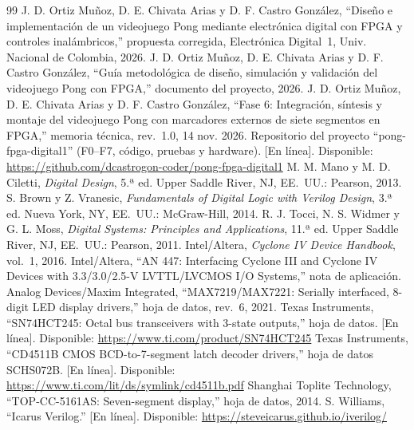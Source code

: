 \documentclass[conference,a4paper]{IEEEtran}
\begin{document}
\begin{thebibliography}{99}
 J. D. Ortiz Muñoz, D. E. Chivata Arias y D. F. Castro González, ``Diseño e implementación de un videojuego Pong mediante electrónica digital con FPGA y controles inalámbricos,'' propuesta corregida, Electrónica Digital~1, Univ. Nacional de Colombia, 2026.
 J. D. Ortiz Muñoz, D. E. Chivata Arias y D. F. Castro González, ``Guía metodológica de diseño, simulación y validación del videojuego Pong con FPGA,'' documento del proyecto, 2026.
 J. D. Ortiz Muñoz, D. E. Chivata Arias y D. F. Castro González, ``Fase 6: Integración, síntesis y montaje del videojuego Pong con marcadores externos de siete segmentos en FPGA,'' memoria técnica, rev.~1.0, 14 nov. 2026.
 Repositorio del proyecto ``pong-fpga-digital1'' (F0--F7, código, pruebas y hardware). [En línea]. Disponible: \url{https://github.com/dcastrogon-coder/pong-fpga-digital1}
 M. M. Mano y M. D. Ciletti, \textit{Digital Design}, 5.ª ed. Upper Saddle River, NJ, EE.~UU.: Pearson, 2013.
 S. Brown y Z. Vranesic, \textit{Fundamentals of Digital Logic with Verilog Design}, 3.ª ed. Nueva York, NY, EE.~UU.: McGraw-Hill, 2014.
 R. J. Tocci, N. S. Widmer y G. L. Moss, \textit{Digital Systems: Principles and Applications}, 11.ª ed. Upper Saddle River, NJ, EE.~UU.: Pearson, 2011.
 Intel/Altera, \textit{Cyclone IV Device Handbook}, vol.~1, 2016.
 Intel/Altera, ``AN 447: Interfacing Cyclone III and Cyclone IV Devices with 3.3/3.0/2.5-V LVTTL/LVCMOS I/O Systems,'' nota de aplicación.
 Analog Devices/Maxim Integrated, ``MAX7219/MAX7221: Serially interfaced, 8-digit LED display drivers,'' hoja de datos, rev.~6, 2021.
 Texas Instruments, ``SN74HCT245: Octal bus transceivers with 3-state outputs,'' hoja de datos. [En línea]. Disponible: \url{https://www.ti.com/product/SN74HCT245}
 Texas Instruments, ``CD4511B CMOS BCD-to-7-segment latch decoder drivers,'' hoja de datos SCHS072B. [En línea]. Disponible: \url{https://www.ti.com/lit/ds/symlink/cd4511b.pdf}
 Shanghai Toplite Technology, ``TOP-CC-5161AS: Seven-segment display,'' hoja de datos, 2014.
 S. Williams, ``Icarus Verilog.'' [En línea]. Disponible: \url{https://steveicarus.github.io/iverilog/}
\end{thebibliography}
\end{document}
